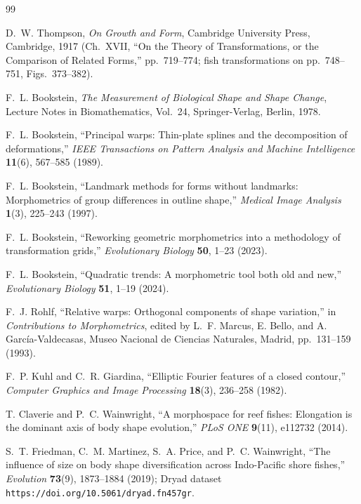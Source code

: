 \documentclass[11pt,a4paper]{article}
\theoremstyle{definition}
\theoremstyle{remark}
\begin{document}
\begin{thebibliography}{99}

D.~W. Thompson, \emph{On Growth and Form}, Cambridge University Press, Cambridge, 1917 (Ch.\ XVII, ``On the Theory of Transformations, or the Comparison of Related Forms,'' pp.\ 719--774; fish transformations on pp.\ 748--751, Figs.\ 373--382).

F.~L. Bookstein, \emph{The Measurement of Biological Shape and Shape Change}, Lecture Notes in Biomathematics, Vol.\ 24, Springer-Verlag, Berlin, 1978.

F.~L. Bookstein, ``Principal warps: Thin-plate splines and the decomposition of deformations,'' \emph{IEEE Transactions on Pattern Analysis and Machine Intelligence} \textbf{11}(6), 567--585 (1989).

F.~L. Bookstein, ``Landmark methods for forms without landmarks: Morphometrics of group differences in outline shape,'' \emph{Medical Image Analysis} \textbf{1}(3), 225--243 (1997).

F.~L. Bookstein, ``Reworking geometric morphometrics into a methodology of transformation grids,'' \emph{Evolutionary Biology} \textbf{50}, 1--23 (2023).

F.~L. Bookstein, ``Quadratic trends: A morphometric tool both old and new,'' \emph{Evolutionary Biology} \textbf{51}, 1--19 (2024).

F.~J. Rohlf, ``Relative warps: Orthogonal components of shape variation,'' in \emph{Contributions to Morphometrics}, edited by L.~F. Marcus, E. Bello, and A. Garc\'ia-Valdecasas, Museo Nacional de Ciencias Naturales, Madrid, pp.\ 131--159 (1993).

F.~P. Kuhl and C.~R. Giardina, ``Elliptic Fourier features of a closed contour,'' \emph{Computer Graphics and Image Processing} \textbf{18}(3), 236--258 (1982).

T. Claverie and P.~C. Wainwright, ``A morphospace for reef fishes: Elongation is the dominant axis of body shape evolution,'' \emph{PLoS ONE} \textbf{9}(11), e112732 (2014).

S.~T. Friedman, C.~M. Martinez, S.~A. Price, and P.~C. Wainwright, ``The influence of size on body shape diversification across Indo-Pacific shore fishes,'' \emph{Evolution} \textbf{73}(9), 1873--1884 (2019); Dryad dataset \texttt{https://doi.org/10.5061/dryad.fn457gr}.


\end{thebibliography}
\end{document}

